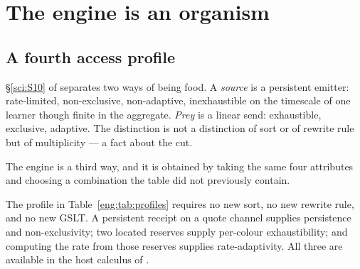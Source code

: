 \section{The engine is an organism}\label{eng:S4}
\label{eng:sec:organism}

\subsection{A fourth access profile}\label{eng:S4.1}

\S\ref{sci:S10} of \chSci separates two ways of being food. A \emph{source} is
a persistent emitter: rate-limited, non-exclusive, non-adaptive,
inexhaustible on the timescale of one learner though finite in the
aggregate. \emph{Prey} is a linear send: exhaustible, exclusive, adaptive.
The distinction is not a distinction of sort or of rewrite rule but of
multiplicity --- a fact about the cut.

The engine is a third way, and it is obtained by taking the same four
attributes and choosing a combination the table did not previously contain.

\begin{table}[t]
\centering\small
{}
\caption{The engine as a fourth access profile. It is source-like in
persistence and non-exclusivity, prey-like in exhaustibility, and unique
in that what adapts is not its behaviour under attack but its
\emph{terms}.}
\label{eng:tab:profiles}
\end{table}

\begin{proposition}\label{eng:engine-derived-imported}
The profile in Table~\ref{eng:tab:profiles} requires no new sort, no new
rewrite rule, and no new GSLT. A persistent receipt on a quote channel
supplies persistence and non-exclusivity; two located reserves supply
per-colour exhaustibility; and computing the rate from those reserves
supplies rate-adaptivity. All three are available in the host calculus of
\chSci.
\end{proposition}


